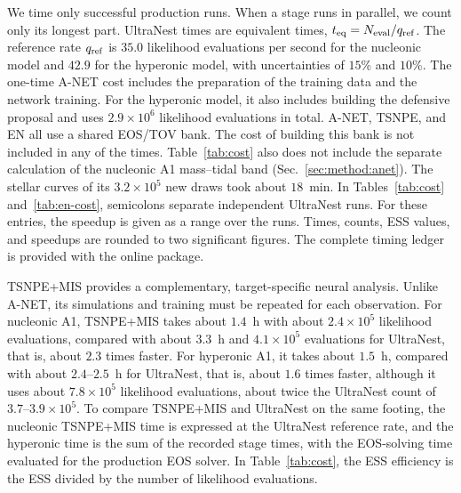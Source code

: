 \documentclass[aps,prd,twocolumn,superscriptaddress,nofootinbib,longbibliography]{revtex4-2}
\begin{document}
We time only successful production runs. When a stage runs in parallel, we count
only its longest part. UltraNest times are equivalent times,
$t_{\rm eq}=N_{\rm eval}/q_{\rm ref}$. The reference rate $q_{\rm ref}$ is $35.0$
likelihood evaluations per second for the nucleonic model and $42.9$ for the
hyperonic model, with uncertainties of $15\%$ and $10\%$. The one-time A-NET cost
includes the preparation of the training data and the network training. For the
hyperonic model, it also includes building the defensive proposal and uses
$2.9\times10^{6}$ likelihood evaluations in total. A-NET, TSNPE, and EN all use a
shared EOS/TOV bank. The cost of building this bank is not included in any of the
times. Table~\ref{tab:cost} also does not include the separate calculation of the
nucleonic A1 mass--tidal band (Sec.~\ref{sec:method:anet}). The stellar curves of
its $3.2\times10^{5}$ new draws took about $18$~min. In Tables~\ref{tab:cost}
and~\ref{tab:en-cost}, semicolons separate independent UltraNest runs. For these
entries, the speedup is given as a range over the runs. Times, counts, ESS values,
and speedups are rounded to two significant figures. The complete timing ledger is
provided with the online package.

TSNPE+MIS provides a complementary, target-specific
neural analysis. Unlike A-NET, its simulations and training must be repeated
for each observation. For nucleonic A1, TSNPE+MIS takes about $1.4$~h with
about $2.4\times10^{5}$ likelihood evaluations, compared with about $3.3$~h and
$4.1\times10^{5}$ evaluations for UltraNest, that is, about $2.3$ times faster.
For hyperonic A1, it takes about $1.5$~h, compared with about $2.4$--$2.5$~h
for UltraNest, that is, about $1.6$ times faster, although it uses about
$7.8\times10^{5}$ likelihood evaluations, about twice the UltraNest count of
$3.7$--$3.9\times10^{5}$. To compare TSNPE+MIS and UltraNest on the same footing, the nucleonic
TSNPE+MIS time is expressed at the UltraNest reference rate, and the hyperonic time
is the sum of the recorded stage times, with the EOS-solving time evaluated for the
production EOS solver. In Table~\ref{tab:cost}, the ESS efficiency is the
ESS divided by the number of likelihood evaluations.
\end{document}
